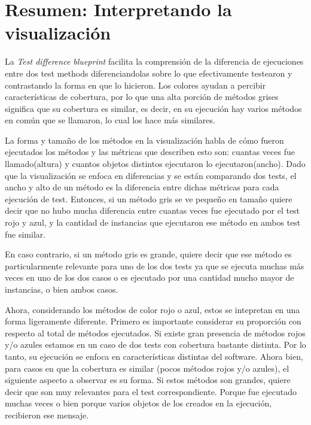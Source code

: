 
\section{Resumen: Interpretando la visualización}


\par La \emph{Test difference blueprint} facilita la comprensión de la diferencia de ejecuciones entre dos test methods diferenciandolas sobre lo que efectivamente testearon y contrastando la forma en que lo hicieron. Los colores ayudan a percibir características de cobertura, por lo que una alta porción de métodos grises significa que su cobertura es similar, es decir, en su ejecución hay varios métodos en común que se llamaron, lo cual los hace más similares.

\par La forma y tamaño de los métodos en la visualización habla de cómo fueron ejecutados los métodos y las métricas que describen esto son: cuantas veces fue llamado(altura) y cuantos objetos distintos ejecutaron lo ejecutaron(ancho). Dado que la visualización se enfoca en diferencias y se están comparando dos tests, el ancho y alto de un método es la diferencia entre dichas métricas para cada ejecución de test. Entonces, si un método gris se ve pequeño en tamaño quiere decir que no hubo mucha diferencia entre cuantas veces fue ejecutado por el test rojo y azul, y la cantidad de instancias que ejecutaron ese método en ambos test fue similar. 

\par En caso contrario, si un método gris es grande, quiere decir que ese método es particularmente relevante para uno de los dos tests ya que se ejecuta muchas más veces en uno de los dos casos o es ejecutado por una cantidad mucho mayor de instancias, o bien ambos casos. 

\par Ahora, considerando los métodos de color rojo o azul, estos se intepretan en una forma ligeramente diferente. Primero es importante considerar su proporción con respecto al total de métodos ejecutados. Si existe gran presencia de métodos rojos y/o azules estamos en un caso de dos tests con cobertura bastante distinta. Por lo tanto, su ejecución se enfoca en características distintas del software. Ahora bien, para casos en que la cobertura es similar (pocos métodos rojos y/o azules), el siguiente aspecto a observar es su forma. Si estos métodos son grandes, quiere decir que son muy relevantes para el test correspondiente. Porque fue ejecutado muchas veces o bien porque varios objetos de los creados en la ejecución, recibieron ese mensaje.

